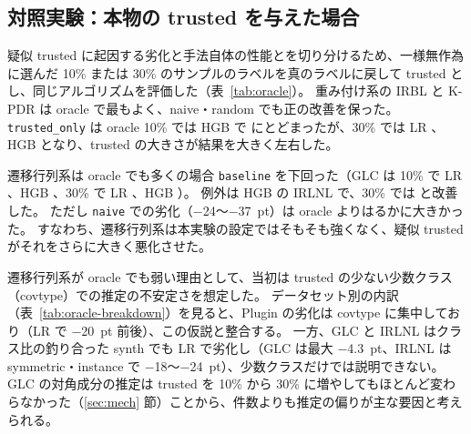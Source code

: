 \documentclass[a4paper,10pt]{ltjsarticle}
\newcommand{\method}[1]{\texttt{#1}}
\newcommand{\cl}{\textsf{cleanlab}}
\begin{document}
\begin{table}[tbp]
  \centering
  \caption{\cl{} の検出性能と疑似分割の誤ラベル率（\%、3 データセット $\times$ 5 シードの平均）。指摘率は誤り判定を受けたサンプルの割合。T は trusted、U は untrusted。\method{naive} では $\mathcal{U} = \mathcal{I}$ のため naive U の誤ラベル率は適合率に等しく、naive T の大きさは 1 $-$ 指摘率である。}
  \label{tab:diag}
  \footnotesize
  \setlength{\tabcolsep}{3.5pt}
  
\end{table}

\subsection{対照実験：本物の trusted を与えた場合}\label{sec:oracle}
疑似 trusted に起因する劣化と手法自体の性能とを切り分けるため、一様無作為に選んだ 10\% または 30\% のサンプルのラベルを真のラベルに戻して trusted とし、同じアルゴリズムを評価した（表~\ref{tab:oracle}）。
重み付け系の IRBL と K-PDR は oracle で最もよく、naive・random でも正の改善を保った。
\method{trusted\_only} は oracle 10\% では HGB で \OHGBTRUSTEDONLYTen{} にとどまったが、30\% では LR \OLRTRUSTEDONLYThirty{}、HGB \OHGBTRUSTEDONLYThirty{} となり、trusted の大きさが結果を大きく左右した。

遷移行列系は oracle でも多くの場合 \method{baseline} を下回った（GLC は 10\% で LR \OLRGLCTen{}、HGB \OHGBGLCTen{}、30\% で LR \OLRGLCThirty{}、HGB \OHGBGLCThirty{}）。
例外は HGB の IRLNL で、30\% では \OHGBIRLNLThirty{} と改善した。
ただし \method{naive} での劣化（$-$24～$-$37~pt）は oracle よりはるかに大きかった。
すなわち、遷移行列系は本実験の設定ではそもそも強くなく、疑似 trusted がそれをさらに大きく悪化させた。

遷移行列系が oracle でも弱い理由として、当初は trusted の少ない少数クラス（covtype）での推定の不安定さを想定した。
データセット別の内訳（表~\ref{tab:oracle-breakdown}）を見ると、Plugin の劣化は covtype に集中しており（LR で $-$20~pt 前後）、この仮説と整合する。
一方、GLC と IRLNL はクラス比の釣り合った synth でも LR で劣化し（GLC は最大 $-$4.3~pt、IRLNL は symmetric・instance で $-$18～$-$24~pt）、少数クラスだけでは説明できない。
GLC の対角成分の推定は trusted を 10\% から 30\% に増やしてもほとんど変わらなかった（\ref{sec:mech} 節）ことから、件数よりも推定の偏りが主な要因と考えられる。

\begin{table}[tbp]
  \centering
  \caption{trusted の作り方による $\Delta$（pt）の比較。naive・random は \cl{} による疑似 trusted、oracle10・oracle30 は一様無作為に選んだ 10\%・30\% を真のラベルに戻した本物の trusted。$^\dagger$ \method{bq/naive/trusted\_only} は \method{cl\_prune} と同一のため、その値を示した。}
  \label{tab:oracle}
  \footnotesize
  
\end{table}
\end{document}
